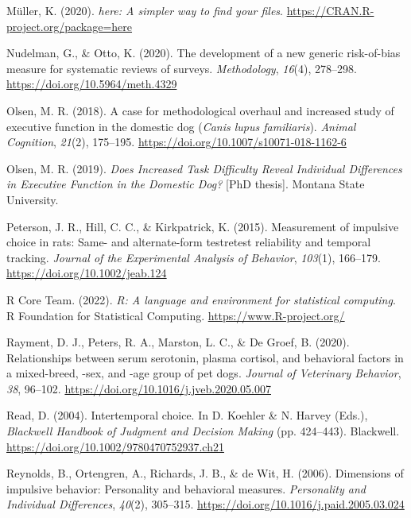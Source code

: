 \documentclass[
  ,pub,floatsintext]{apa6}
\newlength{\cslhangindent}
\newlength{\cslentryspacingunit} %
\newenvironment{CSLReferences}[2] %
 {%
  \setlength{\parindent}{0pt}
  \ifodd #1
  \let\oldpar\par
  \def\par{\hangindent=\cslhangindent\oldpar}
  \fi
  \setlength{\parskip}{#2\cslentryspacingunit}
 }%
 {}
\begin{document}
\begin{CSLReferences}{1}{0}
\leavevmode{}%
Müller, K. (2020). \emph{{here}: A simpler way to find your files}. \url{https://CRAN.R-project.org/package=here}

\leavevmode{}%
Nudelman, G., \& Otto, K. (2020). The development of a new generic risk-of-bias measure for systematic reviews of surveys. \emph{Methodology}, \emph{16}(4), 278--298. \url{https://doi.org/10.5964/meth.4329}

\leavevmode{}%
Olsen, M. R. (2018). A case for methodological overhaul and increased study of executive function in the domestic dog (\emph{{Canis} lupus familiaris}). \emph{Animal Cognition}, \emph{21}(2), 175--195. \url{https://doi.org/10.1007/s10071-018-1162-6}

\leavevmode{}%
Olsen, M. R. (2019). \emph{Does {Increased Task Difficulty Reveal Individual Differences} in {Executive Function} in the {Domestic Dog}?} {[}PhD thesis{]}. Montana State University.

\leavevmode{}%
Peterson, J. R., Hill, C. C., \& Kirkpatrick, K. (2015). Measurement of impulsive choice in rats: Same- and alternate-form test\textendash retest reliability and temporal tracking. \emph{Journal of the Experimental Analysis of Behavior}, \emph{103}(1), 166--179. \url{https://doi.org/10.1002/jeab.124}

\leavevmode{}%
R Core Team. (2022). \emph{R: A language and environment for statistical computing}. R Foundation for Statistical Computing. \url{https://www.R-project.org/}

\leavevmode{}%
Rayment, D. J., Peters, R. A., Marston, L. C., \& De Groef, B. (2020). Relationships between serum serotonin, plasma cortisol, and behavioral factors in a mixed-breed, -sex, and -age group of pet dogs. \emph{Journal of Veterinary Behavior}, \emph{38}, 96--102. \url{https://doi.org/10.1016/j.jveb.2020.05.007}

\leavevmode{}%
Read, D. (2004). Intertemporal choice. In D. Koehler \& N. Harvey (Eds.), \emph{Blackwell {Handbook} of {Judgment} and {Decision Making}} (pp. 424--443). {Blackwell}. \url{https://doi.org/10.1002/9780470752937.ch21}

\leavevmode{}%
Reynolds, B., Ortengren, A., Richards, J. B., \& de Wit, H. (2006). Dimensions of impulsive behavior: Personality and behavioral measures. \emph{Personality and Individual Differences}, \emph{40}(2), 305--315. \url{https://doi.org/10.1016/j.paid.2005.03.024}


\end{CSLReferences}
\end{document}
